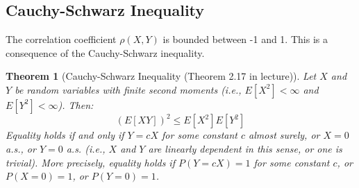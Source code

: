 \documentclass[11pt]{article}
\newtheorem{theorem}{Theorem}[section]
\begin{document}
\subsection{Cauchy-Schwarz Inequality}
The correlation coefficient $\rho(X,Y)$ is bounded between -1 and 1. This is a consequence of the Cauchy-Schwarz inequality.

\begin{theorem}[Cauchy-Schwarz Inequality (Theorem 2.17 in lecture)]
\label{thm:cauchy_schwarz}
Let $X$ and $Y$ be random variables with finite second moments (i.e., $E[X^2] < \infty$ and $E[Y^2] < \infty$). Then:
\begin{equation}
(E[XY])^2 \le E[X^2]E[Y^2]
\end{equation}
Equality holds if and only if $Y = cX$ for some constant $c$ almost surely, or $X=0$ a.s., or $Y=0$ a.s. (i.e., $X$ and $Y$ are linearly dependent in this sense, or one is trivial). More precisely, equality holds if $P(Y=cX)=1$ for some constant $c$, or $P(X=0)=1$, or $P(Y=0)=1$.
\end{theorem}
\end{document}
